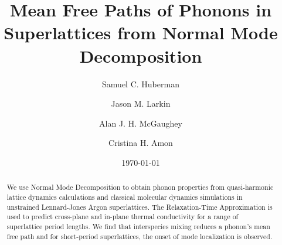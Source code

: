 \documentclass[aps,prb,preprint,preprintnumbers,amsmath,amssymb,floatfix,superscriptaddress]{revtex4}
\begin{document}
\title{Mean Free Paths of Phonons in Superlattices from Normal Mode Decomposition}
\author{Samuel C. Huberman}
\author{Jason M. Larkin}
\author{Alan J. H. McGaughey}
\author{Cristina H. Amon}

\date{\today}%
\vspace{14mm}
  
\begin{abstract}

We use Normal Mode Decomposition to obtain phonon properties from quasi-harmonic lattice dynamics calculations and classical molecular dynamics simulations in unstrained Lennard-Jones Argon superlattices. The Relaxation-Time Approximation is used to predict cross-plane and in-plane thermal conductivity for a range of superlattice period lengths. We find that interspecies mixing reduces a phonon's mean free path and for short-period superlattices, the onset of mode localization is observed.

\end{abstract}
\maketitle
\end{document}
